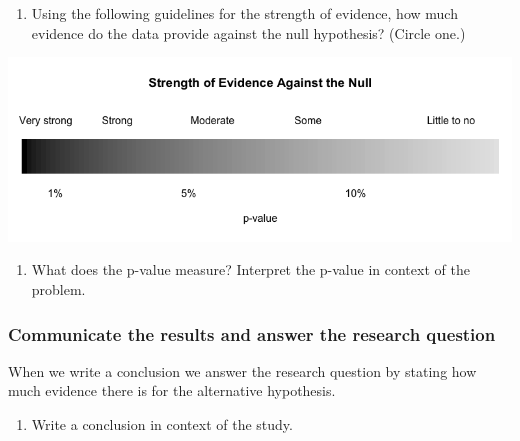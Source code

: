 \documentclass[
]{report}
\providecommand{\tightlist}{%
  \setlength{\itemsep}{0pt}\setlength{\parskip}{0pt}}
\begin{document}
\begin{enumerate}
\def\labelenumi{\arabic{enumi}.}
\setcounter{enumi}{22}
\tightlist
\item
  Using the following guidelines for the strength of evidence, how much evidence do the data provide against the null hypothesis? (Circle one.)
\end{enumerate}

\begin{center}\includegraphics[width=0.9\linewidth]{images/soe_gradient_grayscale} \end{center}

\newpage

\begin{enumerate}
\def\labelenumi{\arabic{enumi}.}
\setcounter{enumi}{23}
\tightlist
\item
  What does the p-value measure? Interpret the p-value in context of the problem.
\end{enumerate}

\vspace{1in}

\hypertarget{communicate-the-results-and-answer-the-research-question}{%
\subsubsection*{Communicate the results and answer the research question}\label{communicate-the-results-and-answer-the-research-question}}

When we write a conclusion we answer the research question by stating how much evidence there is for the alternative hypothesis.

\begin{enumerate}
\def\labelenumi{\arabic{enumi}.}
\setcounter{enumi}{24}
\tightlist
\item
  Write a conclusion in context of the study.
\end{enumerate}

\vspace{1in}
\end{document}
